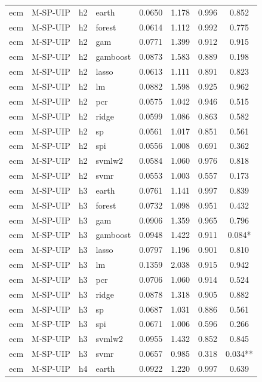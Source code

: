 \begin{ThreePartTable}
\begin{longtable}[t]{llclcccc}
\addlinespace
ecm & M-SP-UIP & h2 & earth & 0.0650 & 1.178 & 0.996 & 0.852\\
ecm & M-SP-UIP & h2 & forest & 0.0614 & 1.112 & 0.992 & 0.775\\
ecm & M-SP-UIP & h2 & gam & 0.0771 & 1.399 & 0.912 & 0.915\\
ecm & M-SP-UIP & h2 & gamboost & 0.0873 & 1.583 & 0.889 & 0.198\\
ecm & M-SP-UIP & h2 & lasso & 0.0613 & 1.111 & 0.891 & 0.823\\
ecm & M-SP-UIP & h2 & lm & 0.0882 & 1.598 & 0.925 & 0.962\\
ecm & M-SP-UIP & h2 & pcr & 0.0575 & 1.042 & 0.946 & 0.515\\
ecm & M-SP-UIP & h2 & ridge & 0.0599 & 1.086 & 0.863 & 0.582\\
ecm & M-SP-UIP & h2 & sp & 0.0561 & 1.017 & 0.851 & 0.561\\
ecm & M-SP-UIP & h2 & spi & 0.0556 & 1.008 & 0.691 & 0.362\\
ecm & M-SP-UIP & h2 & svmlw2 & 0.0584 & 1.060 & 0.976 & 0.818\\
ecm & M-SP-UIP & h2 & svmr & 0.0553 & 1.003 & 0.557 & 0.173\\
\addlinespace
ecm & M-SP-UIP & h3 & earth & 0.0761 & 1.141 & 0.997 & 0.839\\
ecm & M-SP-UIP & h3 & forest & 0.0732 & 1.098 & 0.951 & 0.432\\
ecm & M-SP-UIP & h3 & gam & 0.0906 & 1.359 & 0.965 & 0.796\\
ecm & M-SP-UIP & h3 & gamboost & 0.0948 & 1.422 & 0.911 & 0.084*\\
ecm & M-SP-UIP & h3 & lasso & 0.0797 & 1.196 & 0.901 & 0.810\\
ecm & M-SP-UIP & h3 & lm & 0.1359 & 2.038 & 0.915 & 0.942\\
ecm & M-SP-UIP & h3 & pcr & 0.0706 & 1.060 & 0.914 & 0.524\\
ecm & M-SP-UIP & h3 & ridge & 0.0878 & 1.318 & 0.905 & 0.882\\
ecm & M-SP-UIP & h3 & sp & 0.0687 & 1.031 & 0.886 & 0.561\\
ecm & M-SP-UIP & h3 & spi & 0.0671 & 1.006 & 0.596 & 0.266\\
ecm & M-SP-UIP & h3 & svmlw2 & 0.0955 & 1.432 & 0.852 & 0.845\\
ecm & M-SP-UIP & h3 & svmr & 0.0657 & 0.985 & 0.318 & 0.034**\\
\addlinespace
ecm & M-SP-UIP & h4 & earth & 0.0922 & 1.220 & 0.997 & 0.639\\

\end{longtable}
\end{ThreePartTable}
